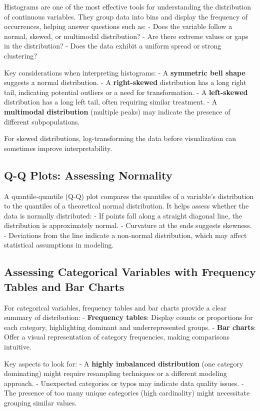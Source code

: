\documentclass[12pt,openany]{book}
\begin{document}
Histograms are one of the most effective tools for understanding the distribution of continuous variables. They group data into bins and display the frequency of occurrences, helping answer questions such as:
- Does the variable follow a normal, skewed, or multimodal distribution?
- Are there extreme values or gaps in the distribution?
- Does the data exhibit a uniform spread or strong clustering?

Key considerations when interpreting histograms:
- A \textbf{symmetric bell shape} suggests a normal distribution.
- A \textbf{right-skewed} distribution has a long right tail, indicating potential outliers or a need for transformation.
- A \textbf{left-skewed} distribution has a long left tail, often requiring similar treatment.
- A \textbf{multimodal distribution} (multiple peaks) may indicate the presence of different subpopulations.

For skewed distributions, log-transforming the data before visualization can sometimes improve interpretability.

\subsection{Q-Q Plots: Assessing Normality}

A quantile-quantile (Q-Q) plot compares the quantiles of a variable’s distribution to the quantiles of a theoretical normal distribution. It helps assess whether the data is normally distributed:
- If points fall along a straight diagonal line, the distribution is approximately normal.
- Curvature at the ends suggests skewness.
- Deviations from the line indicate a non-normal distribution, which may affect statistical assumptions in modeling.

\subsection{Assessing Categorical Variables with Frequency Tables and Bar Charts}

For categorical variables, frequency tables and bar charts provide a clear summary of distribution:
- \textbf{Frequency tables}: Display counts or proportions for each category, highlighting dominant and underrepresented groups.
- \textbf{Bar charts}: Offer a visual representation of category frequencies, making comparisons intuitive.

Key aspects to look for:
- A \textbf{highly imbalanced distribution} (one category dominating) might require resampling techniques or a different modeling approach.
- Unexpected categories or typos may indicate data quality issues.
- The presence of too many unique categories (high cardinality) might necessitate grouping similar values.
\end{document}
